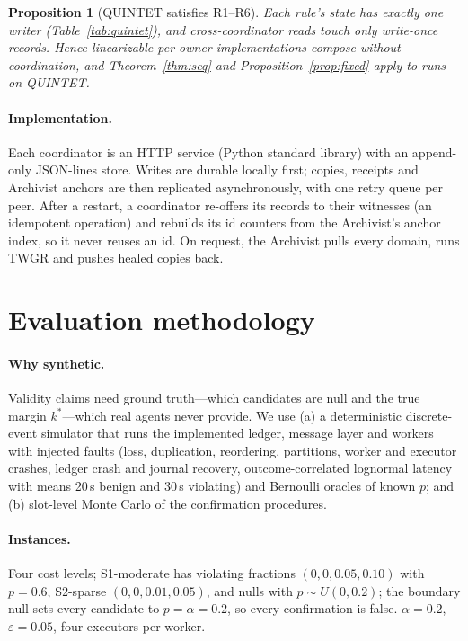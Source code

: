 \documentclass[pdflatex,sn-mathphys-num]{sn-jnl}
\theoremstyle{thmstyleone}
\newtheorem{proposition}[theorem]{Proposition}
\theoremstyle{thmstyletwo}
\theoremstyle{thmstylethree}
\begin{document}
\begin{proposition}[QUINTET satisfies R1--R6]\label{prop:quintet}
Each rule's state has exactly one writer (Table~\ref{tab:quintet}), and cross-coordinator reads touch only write-once records. Hence linearizable per-owner implementations compose without coordination, and Theorem~\ref{thm:seq} and Proposition~\ref{prop:fixed} apply to runs on QUINTET.
\end{proposition}

\paragraph{Implementation.} Each coordinator is an HTTP service (Python standard library) with an append-only JSON-lines store. Writes are durable locally first; copies, receipts and Archivist anchors are then replicated asynchronously, with one retry queue per peer. After a restart, a coordinator re-offers its records to their witnesses (an idempotent operation) and rebuilds its id counters from the Archivist's anchor index, so it never reuses an id. On request, the Archivist pulls every domain, runs TWGR and pushes healed copies back.

\section{Evaluation methodology}\label{sec:method}

\paragraph{Why synthetic.} Validity claims need ground truth---which candidates are null and the true margin $k^*$---which real agents never provide. We use (a) a deterministic discrete-event simulator that runs the implemented ledger, message layer and workers with injected faults (loss, duplication, reordering, partitions, worker and executor crashes, ledger crash and journal recovery, outcome-correlated lognormal latency with means 20\,s benign and 30\,s violating) and Bernoulli oracles of known $p$; and (b) slot-level Monte Carlo of the confirmation procedures.

\paragraph{Instances.} Four cost levels; S1-moderate has violating fractions $(0,0,0.05,0.10)$ with $p=0.6$, S2-sparse $(0,0,0.01,0.05)$, and nulls with $p\sim U(0,0.2)$; the boundary null sets every candidate to $p=\alpha=0.2$, so every confirmation is false. $\alpha=0.2$, $\varepsilon=0.05$, four executors per worker.
\end{document}
